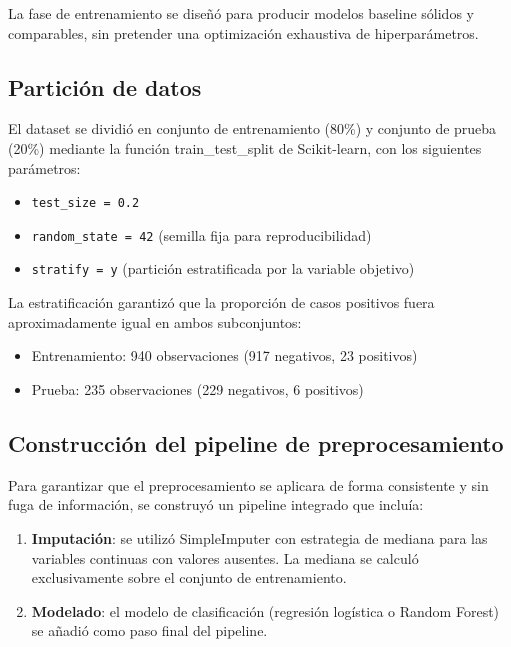 \documentclass[12pt, a4paper, oneside]{report}
\begin{document}
La fase de entrenamiento se diseñó para producir modelos baseline sólidos y comparables, sin pretender una optimización exhaustiva de hiperparámetros.

\subsection{Partición de datos}

El dataset se dividió en conjunto de entrenamiento (80\%) y conjunto de prueba (20\%) mediante la función train\_test\_split de Scikit-learn, con los siguientes parámetros:

\begin{itemize}
    \item \texttt{test\_size = 0.2}
    \item \texttt{random\_state = 42} (semilla fija para reproducibilidad)
    \item \texttt{stratify = y} (partición estratificada por la variable objetivo)
\end{itemize}

La estratificación garantizó que la proporción de casos positivos fuera aproximadamente igual en ambos subconjuntos:

\begin{itemize}
    \item Entrenamiento: 940 observaciones (917 negativos, 23 positivos)
    \item Prueba: 235 observaciones (229 negativos, 6 positivos)
\end{itemize}

\subsection{Construcción del pipeline de preprocesamiento}

Para garantizar que el preprocesamiento se aplicara de forma consistente y sin fuga de información, se construyó un pipeline integrado que incluía:

\begin{enumerate}
    \item \textbf{Imputación}: se utilizó SimpleImputer con estrategia de mediana para las variables continuas con valores ausentes. La mediana se calculó exclusivamente sobre el conjunto de entrenamiento.
    \item \textbf{Modelado}: el modelo de clasificación (regresión logística o Random Forest) se añadió como paso final del pipeline.
\end{enumerate}
\end{document}
